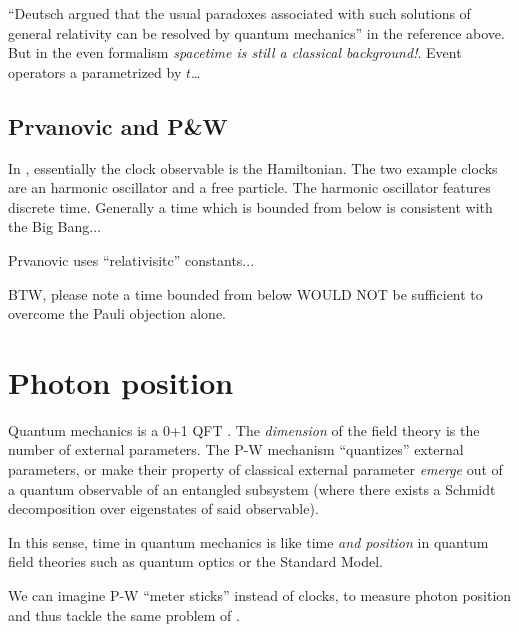 ``Deutsch argued that
the usual paradoxes associated with such solutions of general
relativity can be resolved by quantum mechanics''  in the reference above. But in the even formalism
\emph{spacetime is still a classical background!}. Event operators a parametrized by $t$\dots

\subsection{Prvanovic and P\&W}
In \cite{Prvanovic}, essentially the clock observable is the Hamiltonian.
The two example clocks are an harmonic oscillator and a free particle.
The harmonic oscillator features discrete time. Generally a time which is
{bounded from below}
is consistent with the Big Bang...

Prvanovic uses ``relativisitc'' constants...

BTW, please note a time bounded from below WOULD NOT be sufficient to overcome the Pauli objection alone.

\section{Photon position}

Quantum mechanics is a 0+1 QFT \parencite{QFT_0+1}.
The \emph{dimension} of the field theory is the number of external parameters.
The P-W mechanism ``quantizes'' external parameters, or make their property
of classical external parameter \emph{emerge} out of a quantum observable
of an entangled subsystem (where there exists a Schmidt decomposition over
eigenstates of said observable).

In this sense, time in quantum mechanics is like time \emph{and position}
in quantum field theories such as quantum optics or the Standard Model.

We can imagine P-W ``meter sticks'' instead of clocks, to measure
photon position and thus tackle the same problem of \cite{HawtonPhotonPosition}.

